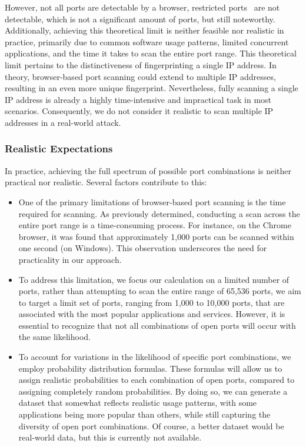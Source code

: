 However, not all ports are detectable by a browser, restricted ports~ are not detectable, which is not a significant amount of ports, but still noteworthy.
Additionally, achieving this theoretical limit is neither feasible nor realistic in practice, primarily due to common software usage patterns, limited concurrent applications, and the time it takes to scan the entire port range. 
This theoretical limit pertains to the distinctiveness of fingerprinting a single IP address. In theory, browser-based port scanning could extend to multiple IP addresses, resulting in an even more unique fingerprint. 
Nevertheless, fully scanning a single IP address is already a highly time-intensive and impractical task in most scenarios. 
Consequently, we do not consider it realistic to scan multiple IP addresses in a real-world attack.
\subsubsection{Realistic Expectations}

In practice, achieving the full spectrum of possible port combinations is neither practical nor realistic. Several factors contribute to this:

\begin{itemize}
\item One of the primary limitations of browser-based port scanning is the time required for scanning. As previously determined, conducting a scan across the entire port range is a time-consuming process. For instance, on the Chrome browser, it was found that approximately 1,000 ports can be scanned within one second (on Windows). This observation underscores the need for practicality in our approach.

\item To address this limitation, we focus our calculation on a limited number of ports, rather than attempting to scan the entire range of 65,536 ports, we aim to target a limit set of ports, ranging from 1,000 to 10,000 ports, that are associated with the most popular applications and services. However, it is essential to recognize that not all combinations of open ports will occur with the same likelihood.

\item To account for variations in the likelihood of specific port combinations, we employ probability distribution formulas. These formulas will allow us to assign realistic probabilities to each combination of open ports, compared to assigning completely random probabilities. By doing so, we can generate a dataset that somewhat reflects realistic usage patterns, with some applications being more popular than others, while still capturing the diversity of open port combinations. Of course, a better dataset would be real-world data, but this is currently not available.
\end{itemize}

